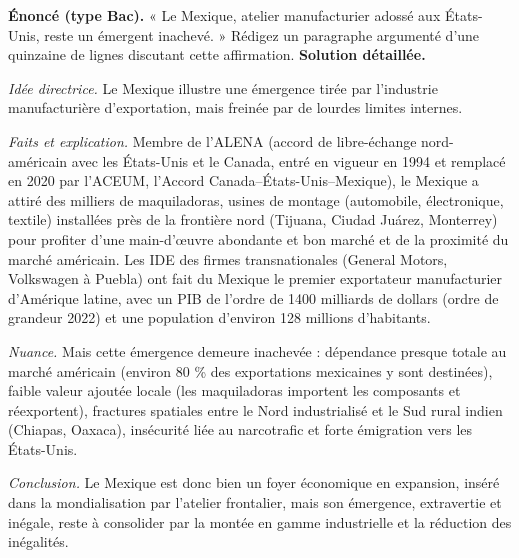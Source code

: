 \documentclass[11pt]{article}
\newcommand{\cle}[1]{{\popxbold\color{popdark}#1}}
\begin{document}
\begin{exoresolu}
\textbf{Énoncé (type Bac).} « Le Mexique, atelier manufacturier adossé aux États-Unis, reste un émergent inachevé. » Rédigez un paragraphe argumenté d'une quinzaine de lignes discutant cette affirmation.
\tcblower
\textbf{Solution détaillée.}

\emph{Idée directrice.} Le Mexique illustre une émergence tirée par l'industrie manufacturière d'exportation, mais freinée par de lourdes limites internes.

\emph{Faits et explication.} Membre de l'ALENA (accord de libre-échange nord-américain avec les États-Unis et le Canada, entré en vigueur en 1994 et remplacé en 2020 par l'ACEUM, l'Accord Canada--États-Unis--Mexique), le Mexique a attiré des milliers de \cle{maquiladoras}, usines de montage (automobile, électronique, textile) installées près de la frontière nord (Tijuana, Ciudad Juárez, Monterrey) pour profiter d'une main-d'œuvre abondante et bon marché et de la proximité du marché américain. Les IDE des firmes transnationales (General Motors, Volkswagen à Puebla) ont fait du Mexique le premier exportateur manufacturier d'Amérique latine, avec un PIB de l'ordre de \num{1400} milliards de dollars (ordre de grandeur 2022) et une population d'environ 128 millions d'habitants.

\emph{Nuance.} Mais cette émergence demeure inachevée : dépendance presque totale au marché américain (environ 80 \% des exportations mexicaines y sont destinées), faible valeur ajoutée locale (les maquiladoras importent les composants et réexportent), fractures spatiales entre le Nord industrialisé et le Sud rural indien (Chiapas, Oaxaca), insécurité liée au narcotrafic et forte émigration vers les États-Unis.

\emph{Conclusion.} Le Mexique est donc bien un foyer économique en expansion, inséré dans la mondialisation par l'atelier frontalier, mais son émergence, extravertie et inégale, reste à consolider par la montée en gamme industrielle et la réduction des inégalités.
\end{exoresolu}
\end{document}
